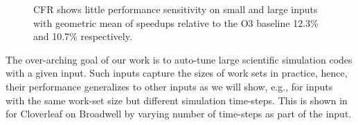 \begin{figure}
\vspace{-1em}
\vspace{-2mm}
\caption{CFR shows little performance sensitivity on small and large inputs with geometric mean of speedups relative to the O3 baseline 12.3\% and 10.7\% respectively.}
\vspace{-4mm}
\label{fig:sensitivity}
\end{figure}
The over-arching goal of our work is to auto-tune large scientific
simulation codes with a given input.  Such inputs capture the sizes of
work sets in practice, hence, their performance generalizes to other
inputs as we will show, e.g., for inputs with the same work-set size
but different simulation time-steps. This is shown in
 for Cloverleaf on Broadwell by varying number of
time-steps as part of the input.

